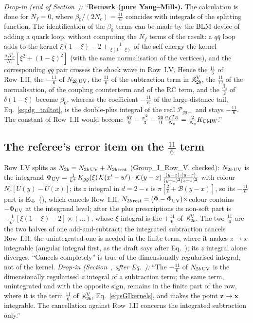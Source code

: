\noindent\emph{Drop-in (end of Section~):} ``\textbf{Remark (pure Yang--Mills).} The calculation is done for $N_f=0$, where $\beta_0/(2N_c)=\frac{11}{6}$ coincides with integrals of the splitting function. The identification of the $\beta_0$ terms can be made by the BLM device of adding a quark loop, without computing the $N_f$ terms of the result: a $q\bar q$ loop adds to the kernel $\xi(1-\xi)-2+\frac{1}{\xi(1-\xi)}$ of the self-energy the kernel $\frac{n_fT_R}{N_c}[\xi^2+(1-\xi)^2]$ (with the same normalisation of the vertices), and the corresponding $q\bar q$ pair crosses the shock wave in Row~I.V. Hence the $\frac{11}{3}$ of Row~I.II, the $-\frac{11}{6}$ of $N_{2b\,\rm UV}$, the $\frac{11}{6}$ of the subtraction term in $\mathfrak K^{\rm V}_{2b}$, the $\frac{11}{12}$ of the normalisation, of the coupling counterterm and of the RC term, and the $\frac{\beta_0}{2}$ of $\delta(1-\xi)$ become $\beta_0$, whereas the coefficient $-\frac{11}{6}$ of the large-distance tail, Eq.~\eqref{eq:dg_tailtot}, is the double-plus integral of the real $\mathcal P_{gg+}$ and stays $-\frac{11}{6}$. The constant of Row~I.II would become $\frac{67}{9}-\frac{\pi^2}{3}-\frac{20}{9}\frac{n_fT_R}{N_c}=\frac{2}{N_c}K_{\rm CMW}$.''

\subsection{The referee's error item on the $\frac{11}{6}$ term}\label{sec:b-err}
Row~I.V splits as $N_{2b}=N_{2b\,\rm UV}+N_{2b\,\rm rest}$ (Group\_I\_Row\_V, checked): $N_{2b\,\rm UV}$ is the integrand $\Phi_{\rm UV}=\frac{1}{k^+}K_{gg}(\xi)\,\mathcal{K}(x'-w')\cdot\mathcal{K}(y-x)\,\frac{(y-z)\cdot(y-x)}{(y-z)^2(x-z)^2}$ with colour $N_c[U(y)-U(x)]$; its $z$ integral in $d=2-\epsilon$ is $\pi[\frac2\epsilon+\mathcal B(y-x)]$, so its $-\frac{11}{6}$ part is Eq.~(), which cancels Row~I.II. $N_{2b\,\rm rest}=(\Phi-\Phi_{\rm UV})\times$colour contains $-\Phi_{\rm UV}$ at the integrand level; after the plus prescriptions its non-soft part is $-\frac{1}{k^+}[\xi(1-\xi)-2]\times(\dots)$, whose $\xi$ integral is the $+\frac{11}{6}$ of $\mathfrak K^{\rm V}_{2b}$. The two $\frac{11}{6}$ are the two halves of one add-and-subtract: the integrated subtraction cancels Row~I.II; the unintegrated one is needed in the finite term, where it makes $z\to x$ integrable (angular integral first, as the draft says after Eq.~); its $z$ integral alone diverges. ``Cancels completely'' is true of the dimensionally regularised integral, not of the kernel. \emph{Drop-in (Section~, after Eq.~):} ``The $-\frac{11}{6}$ of $N_{2b\,\rm UV}$ is the dimensionally regularised $z$ integral of a subtraction term; the same term, unintegrated and with the opposite sign, remains in the finite part of the row, where it is the term $\frac{11}{6}$ of $\mathfrak K^{\rm V}_{2b}$, Eq.~\eqref{eq:sGIkernels}, and makes the point $\mathbf{z}\to\mathbf{x}$ integrable. The cancellation against Row~I.II concerns the integrated subtraction only.''

